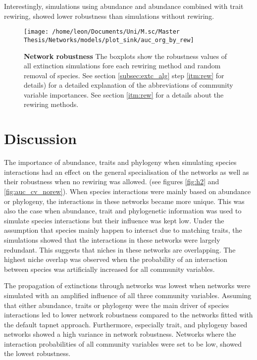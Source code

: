 \documentclass[12pt,a4paper]{article}
\begin{document}
Interestingly, simulations using abundance and abundance combined with trait rewiring, showed lower robustness than simulations without rewiring.
\begin{figure}[H]
	 \texttt{[image: /home/leon/Documents/Uni/M.sc/Master Thesis/Networks/models/plot\_sink/auc\_org\_by\_rew]}
	 \caption{\textbf{Network robustness } The boxplots show the robustness values of all extinction simulations fore each rewiring method and random removal of species. See section \ref{subsec:extc_alg} step \ref{itm:rew} for details) for a detailed explanation of the abbreviations of community variable importances. See section \ref{itm:rew} for a details about the rewiring methods.}
	 \label{fig:auc_org_rew}
\end{figure}

\newpage
	\section{Discussion}

The importance of abundance, traits and phylogeny when simulating species interactions had an effect on the general specialisation of the networks as well as their robustness when no rewiring was allowed. (see figures \ref{fig:h2} and \ref{fig:auc_cv_norew}). When species interactions were mainly based on abundance or phylogeny, the interactions in these networks became more unique. This was also the case when abundance, trait and phylogenetic information was used to simulate species interactions but their influence was kept low. Under the assumption that species mainly happen to interact due to matching traits, the simulations showed that the interactions in these networks were largely redundant. This suggests that niches in these networks are overlapping. The highest niche overlap was observed when the probability of an interaction between species was artificially increased for all community variables.\par
The propagation of extinctions through networks was lowest when networks were simulated with an amplified influence of all three community variables. Assuming that either abundance, traits or phylogeny were the main driver of species interactions led to lower network robustness compared to the networks fitted with the default tapnet approach. Furthermore, especially trait, and phylogeny based networks showed a high variance in network robustness. Networks where the interaction probabilities of all community variables were set to be low, showed the lowest robustness. \par
\end{document}
